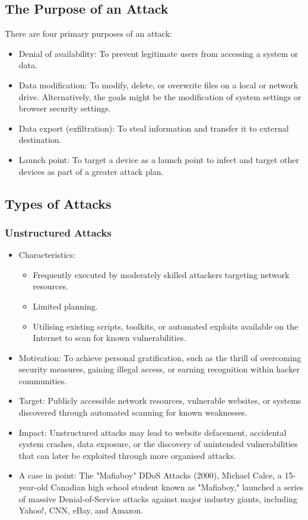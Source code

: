\subsection{The Purpose of an Attack}

There are four primary purposes of an attack:

\begin{itemize}
  \item Denial of availability: To prevent legitimate users from accessing a system or data.
  \item Data modification: To modify, delete, or overwrite files on a local or network drive. Alternatively, the goals might be the modification of system settings or browser security settings.
  \item Data export (exfiltration): To steal information and transfer it to external destination.
  \item Launch point: To target a device as a launch point to infect and target other devices as part of a greater attack plan.
\end{itemize}

\subsection{Types of Attacks}

\subsubsection{Unstructured Attacks}

\begin{itemize}
  \item Characteristics:
  \begin{itemize}
    \item Frequently executed by moderately skilled attackers targeting network resources.
    \item Limited planning.
    \item Utilising existing scripts, toolkits, or automated exploits available on the Internet to scan for known vulnerabilities.
  \end{itemize}
  \item Motivation: To achieve personal gratification, such as the thrill of overcoming security measures, gaining illegal access, or earning recognition within hacker communities.
  \item Target: Publicly accessible network resources, vulnerable websites, or systems discovered through automated scanning for known weaknesses.
  \item Impact: Unstructured attacks may lead to website defacement, accidental system crashes, data exposure, or the discovery of unintended vulnerabilities that can later be exploited through more organised attacks.
  \item A case in point: The "Mafiaboy" DDoS Attacks (2000), Michael Calce, a 15-year-old Canadian high school student known as "Mafiaboy," launched a series of massive Denial-of-Service attacks against major industry giants, including Yahoo!, CNN, eBay, and Amazon.
\end{itemize}

